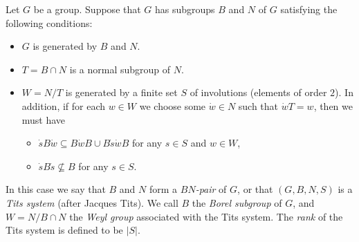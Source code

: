 \documentclass[../Odyssey_Project.tex]{subfiles}
\begin{document}
Let $G$ be a group. Suppose that $G$ has subgroups $B$ and $N$ of $G$ satisfying the following conditions:
\begin{itemize}
    \item $G$ is generated by $B$ and $N$.
    \item $T = B \cap N$ is a normal subgroup of $N$.
    \item $W = N/T$ is generated by a finite set $S$ of involutions (elements of order $2$). In addition, if for each $w \in W$ we choose some $\dot{w} \in N$ such that $\dot{w} T = w$, then we must have
    \begin{itemize}
        \item $\dot{s} B \dot{w} \subseteq B \dot{w} B \cup B \dot{s} \dot{w} B$ for any $s \in S$ and $w \in W$,
        \item $\dot{s} B \dot{s} \nsubseteq B$ for any $s \in S$.
    \end{itemize}
\end{itemize}
In this case we say that $B$ and $N$ form a \emph{$BN$-pair} of $G$, or that $(G, B, N, S)$ is a \emph{Tits system} (after Jacques Tits). We call $B$ the \emph{Borel subgroup} of $G$, and $W = N / B \cap N$ the \emph{Weyl group} associated with the Tits system. The \emph{rank} of the Tits system is defined to be $|S|$.
\end{document}

